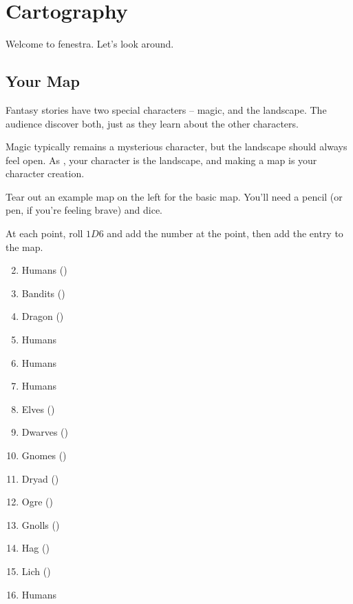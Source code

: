 \chapter[The Cartographers]{Cartography}
\label{civilization}

Welcome to \gls{fenestra}.
Let's look around.

\section{Your Map}
\label{yourMap}

\begin{multicols}{2}

Fantasy stories have two special characters -- magic, and the landscape.
The audience discover both, just as they learn about the other characters.

Magic typically remains a mysterious character, but the landscape should always feel open.
As , your character is the landscape, and making a map is your character creation.


Tear out an example map on the left for the basic map.
You'll need a pencil (or pen, if you're feeling brave) and dice.

At each point, roll $1D6$ and add the number at the point, then add the entry to the map.

\begin{multicols}{2}

\begin{enumerate}
  \setcounter{enumi}{1}
  \item
  Humans
  ()
  \item
  Bandits
  ()
  \item
  Dragon
  ()
  \item
  Humans
  \item
  Humans
  \item
  Humans
  \item
  Elves
  ()
  \item
  Dwarves
  ()
  \item
  Gnomes
  ()
  \item
  Dryad
  ()
  \item
  Ogre
  ()
  \item
  Gnolls
  ()
  \item
  Hag
  ()
  \item
  Lich
  ()
  \item
  Humans
\end{enumerate}


\end{multicols}
\end{multicols}
